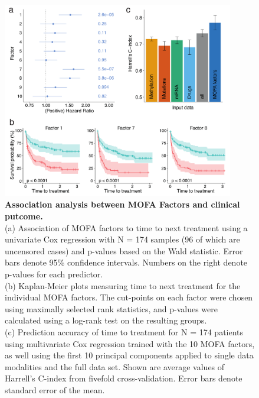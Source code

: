 
\begin{figure}[H]
	\centering 	
	\includegraphics[width=0.9\textwidth]{MOFA_CLL_Cox}
	\caption{
	\textbf{Association analysis between MOFA Factors and clinical putcome.}\\
	(a) Association of MOFA factors to time to next treatment using a univariate Cox regression with N = 174 samples (96 of which are uncensored cases) and p-values based on the Wald statistic. Error bars denote 95\% confidence intervals. Numbers on the right denote p-values for each predictor.\\
	(b) Kaplan-Meier plots measuring time to next treatment for the individual MOFA factors. The cut-points on each factor were chosen using maximally selected rank statistics, and p-values were calculated using a log-rank test on the resulting groups.\\
	(c) Prediction accuracy of time to treatment for N = 174 patients using multivariate Cox regression trained with the 10 MOFA factors, as well using the first 10 principal components applied to single data modalities and the full data set. Shown are average values of Harrell's C-index from fivefold cross-validation. Error bars denote standard error of the mean.
	}
	\label{fig:MOFA_CLL_Cox}
\end{figure}


